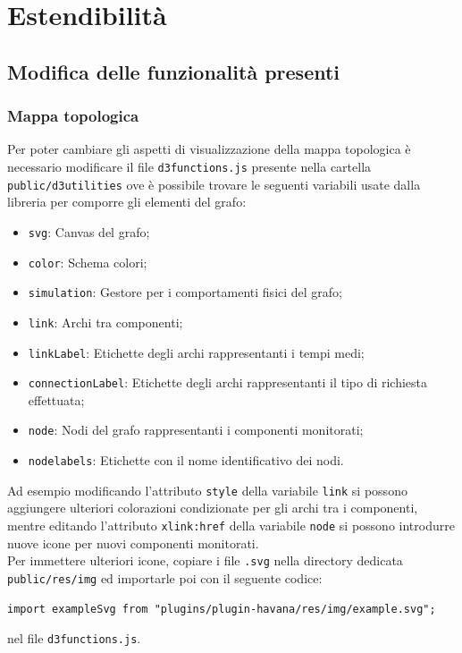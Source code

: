\section{Estendibilità}
\subsection{Modifica delle funzionalità presenti}
\subsubsection{Mappa topologica}
\label{sec:graph}
Per poter cambiare gli aspetti di visualizzazione della mappa topologica è necessario modificare il file \texttt{d3functions.js} presente nella cartella \texttt{public/d3utilities} ove è possibile trovare le seguenti variabili usate dalla libreria  per comporre gli elementi del grafo:
\begin{itemize}
	\item \texttt{svg}: Canvas del grafo;
	\item \texttt{color}: Schema colori;
	\item \texttt{simulation}: Gestore per i comportamenti fisici del grafo;
	\item \texttt{link}: Archi tra componenti;
	\item \texttt{linkLabel}: Etichette degli archi rappresentanti i tempi medi;
	\item \texttt{connectionLabel}: Etichette degli archi rappresentanti il tipo di richiesta effettuata;
	\item \texttt{node}: Nodi del grafo rappresentanti i componenti monitorati;
	\item \texttt{nodelabels}: Etichette con il nome identificativo dei nodi.
\end{itemize}
Ad esempio modificando l'attributo \texttt{style} della variabile \texttt{link} si possono aggiungere ulteriori colorazioni condizionate per gli archi tra i componenti, mentre editando l'attributo \texttt{xlink:href} della variabile \texttt{node} si possono introdurre nuove icone per nuovi componenti monitorati. \\
Per immettere ulteriori icone, copiare i file \texttt{.svg} nella directory dedicata \texttt{public/res/img} ed importarle poi con il seguente codice:
\begin{lstlisting}
import exampleSvg from "plugins/plugin-havana/res/img/example.svg";
\end{lstlisting}
nel file \texttt{d3functions.js}.\\
